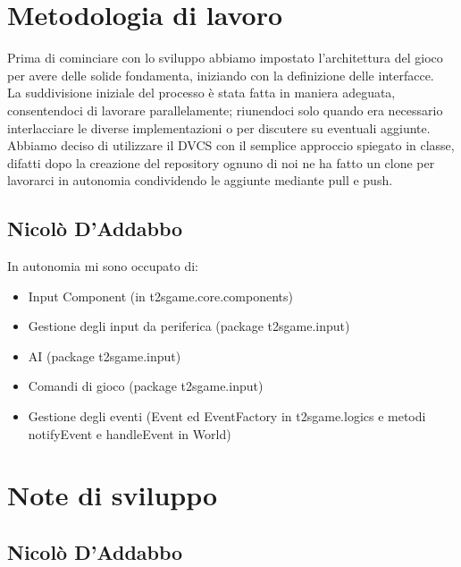 \documentclass[a4paper,12pt]{report}
\begin{document}
\section{Metodologia di lavoro}

Prima di cominciare con lo sviluppo abbiamo impostato l’architettura del gioco per avere delle solide fondamenta, iniziando con la definizione delle interfacce.
\\
La suddivisione iniziale del processo è stata fatta in maniera adeguata, consentendoci di lavorare parallelamente; riunendoci solo quando era necessario interlacciare le diverse implementazioni o per discutere su eventuali aggiunte.
\\
Abbiamo deciso di utilizzare il DVCS con il semplice approccio spiegato in classe, difatti dopo la creazione del repository ognuno di noi ne ha fatto un clone per lavorarci in autonomia condividendo le aggiunte mediante pull e push.

\subsection*{Nicolò D'Addabbo}
In autonomia mi sono occupato di:
\begin{itemize}
\item Input Component (in t2sgame.core.components)
\item Gestione degli input da periferica (package t2sgame.input)
\item AI (package t2sgame.input)
\item Comandi di gioco (package t2sgame.input)
\item Gestione degli eventi (Event ed EventFactory in t2sgame.logics e metodi notifyEvent e handleEvent in World)
\end{itemize}

\section{Note di sviluppo}

\subsection*{Nicolò D'Addabbo}
\end{document}
